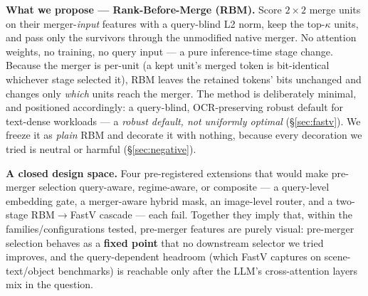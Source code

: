 \documentclass[sigconf,review,anonymous]{acmart}
\begin{document}
\textbf{What we propose --- Rank-Before-Merge (RBM).} Score $2\!\times\!2$ merge
units on their merger-\emph{input} features with a query-blind L2 norm, keep the
top-$\kappa$ units, and pass only the survivors through the unmodified native
merger. No attention weights, no training, no query input --- a pure
inference-time stage change. Because the merger is per-unit (a kept unit's
merged token is bit-identical whichever stage selected it), RBM leaves the
retained tokens' bits unchanged and changes only \emph{which} units reach the
merger. The method is deliberately minimal, and positioned accordingly: a
query-blind, OCR-preserving robust default for text-dense workloads --- a
\emph{robust default, not uniformly optimal} (\S\ref{sec:fastv}). We freeze it
as \emph{plain} RBM and decorate it with nothing, because every decoration we
tried is neutral or harmful (\S\ref{sec:negative}).

\textbf{A closed design space.} Four pre-registered extensions that would make
pre-merger selection query-aware, regime-aware, or composite --- a query-level
embedding gate, a merger-aware hybrid mask, an image-level router, and a
two-stage RBM$\to$FastV cascade --- each fail. Together they imply that, within
the families/configurations tested, pre-merger features are purely visual:
pre-merger selection behaves as a \textbf{fixed point} that no downstream
selector we tried improves, and the query-dependent headroom (which FastV
captures on scene-text/object benchmarks) is reachable only after the LLM's
cross-attention layers mix in the question.
\end{document}
